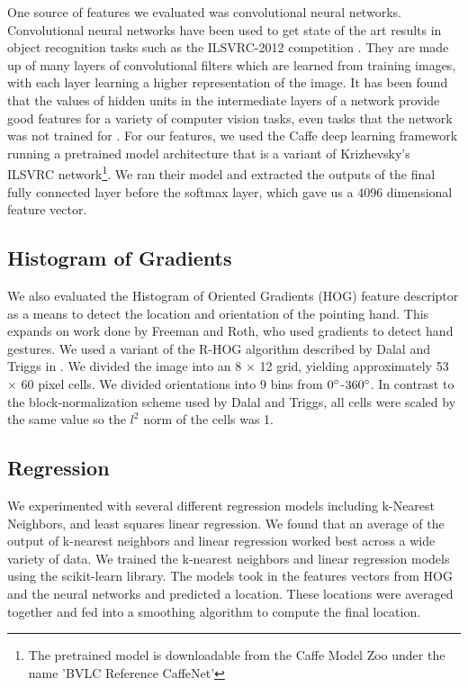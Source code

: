\documentclass[10pt,twocolumn,letterpaper]{article}
\begin{document}
One source of features we evaluated was convolutional neural networks.  Convolutional neural networks have been used to get state of the art results in object recognition tasks such as the ILSVRC-2012 competition \cite{krizhevsky2012imagenet}.  They are made up of many layers of convolutional filters which are learned from training images, with each layer learning a higher representation of the image.   It has been found that the values of hidden units in the intermediate layers of a network provide good features for a variety of computer vision tasks, even tasks that the network was not trained for \cite{donahue2013decaf}.  For our features, we used the Caffe deep learning framework\cite{jia2014caffe} running a pretrained model architecture that is a variant of Krizhevsky's ILSVRC network\cite{krizhevsky2012imagenet}\footnote{The pretrained model is downloadable from the Caffe Model Zoo under the name 'BVLC Reference CaffeNet'}.  We ran their model and extracted the outputs of the final fully connected layer before the softmax layer, which gave us a 4096 dimensional feature vector.

\subsection{Histogram of Gradients}

We also evaluated the Histogram of Oriented Gradients (HOG) feature descriptor \cite{dalal2005histograms} as a means to detect the location and orientation of the pointing hand. This expands on work done by Freeman and Roth, who used gradients to detect hand gestures. We used a variant of the R-HOG algorithm described by Dalal and Triggs in \cite{dalal2005histograms}. We divided the image into an 8 $\times$ 12 grid, yielding approximately 53 $\times$ 60 pixel cells. We divided orientations into 9 bins from $0\degree$-$360\degree$. In contrast to the block-normalization scheme used by Dalal and Triggs, all cells were scaled by the same value so the $l^2$ norm of the cells was 1.

\subsection{Regression}
We experimented with several different regression models including k-Nearest Neighbors, and least squares linear regression. We found that an average of the output of k-nearest neighbors and linear regression worked best across a wide variety of data. We trained the k-nearest neighbors and linear regression models using the scikit-learn library\cite{scikit-learn}.  The models took in the features vectors from HOG and the neural networks and predicted a location. These locations were averaged together and fed into a smoothing algorithm to compute the final location.
\end{document}
